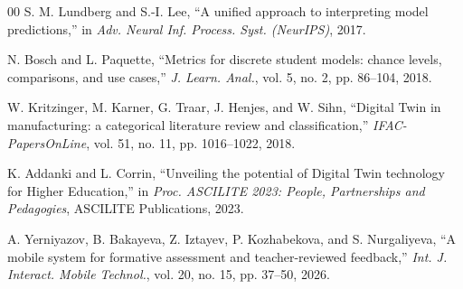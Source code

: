 \documentclass[conference]{IEEEtran}
\begin{document}
\begin{thebibliography}{00}
 S. M. Lundberg and S.-I. Lee, ``A unified approach to
interpreting model predictions,'' in \emph{Adv. Neural Inf. Process. Syst.
(NeurIPS)}, 2017.

 N. Bosch and L. Paquette, ``Metrics for discrete student
models: chance levels, comparisons, and use cases,'' \emph{J. Learn. Anal.}, vol.
5, no. 2, pp. 86--104, 2018.

 W. Kritzinger, M. Karner, G. Traar, J. Henjes, and W.
Sihn, ``Digital Twin in manufacturing: a categorical literature review and
classification,'' \emph{IFAC-PapersOnLine}, vol. 51, no. 11, pp. 1016--1022,
2018.

 K. Addanki and L. Corrin, ``Unveiling the potential of
Digital Twin technology for Higher Education,'' in \emph{Proc. ASCILITE 2023:
People, Partnerships and Pedagogies}, ASCILITE Publications, 2023.

 A. Yerniyazov, B. Bakayeva, Z. Iztayev, P.
Kozhabekova, and S. Nurgaliyeva, ``A mobile system for formative assessment and
teacher-reviewed feedback,'' \emph{Int. J. Interact. Mobile Technol.}, vol. 20,
no. 15, pp. 37--50, 2026.

\end{thebibliography}
\end{document}
